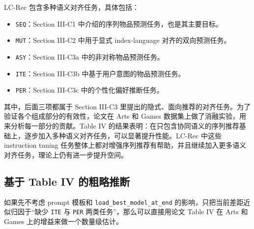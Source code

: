 \documentclass[11pt,a4paper]{ctexart}
\begin{document}
LC-Rec 包含多种语义对齐任务，具体包括：
\begin{itemize}
\item \texttt{SEQ}：Section III-C1 中介绍的序列物品预测任务，也是其主要目标。
\item \texttt{MUT}：Section III-C2 中用于显式 index-language 对齐的双向预测任务。
\item \texttt{ASY}：Section III-C3a 中的非对称物品预测任务。
\item \texttt{ITE}：Section III-C3b 中基于用户意图的物品预测任务。
\item \texttt{PER}：Section III-C3c 中的个性化偏好推断任务。
\end{itemize}

其中，后面三项都属于 Section III-C3 里提出的隐式、面向推荐的对齐任务。为了验证各个组成部分的有效性，论文在 Arts 和 Games 数据集上做了消融实验，用来分析每一部分的贡献。Table IV 的结果表明：在只包含协同语义的序列推荐基础上，逐步加入多种语义对齐任务，可以显著提升性能。LC-Rec 中这些 instruction tuning 任务整体上都对增强序列推荐有帮助，并且继续加入更多语义对齐任务，理论上仍有进一步提升空间。

\subsection{基于 Table IV 的粗略推断}

如果先不考虑 prompt 模板和 \texttt{load\_best\_model\_at\_end} 的影响，只把当前差距近似归因于“缺少 \texttt{ITE} 与 \texttt{PER} 两类任务”，那么可以直接用论文 Table IV 在 Arts 和 Games 上的增益来做一个数量级估计。
\end{document}
